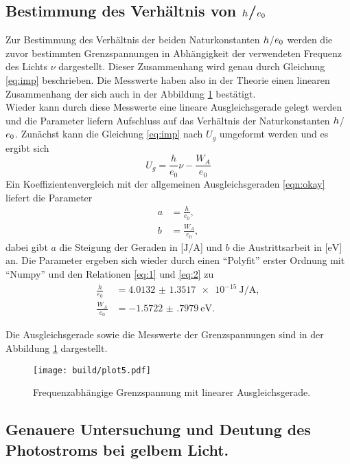 \subsection{Bestimmung des Verhältnis von $\protect h$/$\protect e_{0}$}

Zur Bestimmung des Verhältnis der beiden Naturkonstanten $\protect h$/$\protect e_{0}$ werden die zuvor bestimmten Grenzspannungen in Abhängigkeit der verwendeten Frequenz des Lichts $\nu$ dargestellt.
Dieser Zusammenhang wird genau durch Gleichung \eqref{eq:imp} beschrieben. Die Messwerte haben also in der Theorie einen linearen Zusammenhang der sich auch in der Abbildung \ref{fig:3} bestätigt.
\\
Wieder kann durch diese Messwerte eine lineare Ausgleichsgerade gelegt werden und die Parameter liefern Aufschluss auf das Verhältnis der Naturkonstanten $\protect h$/$\protect e_{0}$.
Zunächst kann die Gleichung \eqref{eq:imp} nach $U_{g}$ umgeformt werden und es ergibt sich
\begin{equation}
U_{g} = \frac{h}{e_{0}} \nu - \frac{W_A}{e_{0}}
\end{equation}
Ein Koeffizientenvergleich mit der allgemeinen Ausgleichsgeraden \eqref{eqn:okay} liefert die Parameter
\begin{align}
    \label{eq:1}
a &= \frac{h}{e_{0}},\\
    \label{eq:2}
b &= \frac{W_A}{e_{0}},
\end{align}
dabei gibt $a$ die Steigung der Geraden in [$\si{\joule\per\ampere}$] und $b$ die Austrittsarbeit in [$\si{\electronvolt}$] an.
Die Parameter ergeben sich wieder durch einen \enquote{Polyfit} erster Ordnung mit \enquote{Numpy} \cite{numpy} und den Relationen \eqref{eq:1} und \eqref{eq:2} zu
\begin{align}
\frac{h}{e_{0}} &= \SI{4.0132(13517)e-15}{\joule\per\ampere},\\
\frac{W_A}{e_{0}} &= \SI{-1.5722(7979)}{\electronvolt}.
\end{align}

Die Ausgleichsgerade sowie die Messwerte der Grenzspannungen sind in der Abbildung \ref{fig:3} dargestellt.

\begin{figure}
    \centering
    \texttt{[image: build/plot5.pdf]}
    \caption{Frequenzabhängige Grenzspannung mit linearer Ausgleichsgerade.}
    \label{fig:3}
\end{figure}

\subsection{Genauere Untersuchung und Deutung des Photostroms bei gelbem Licht.}

